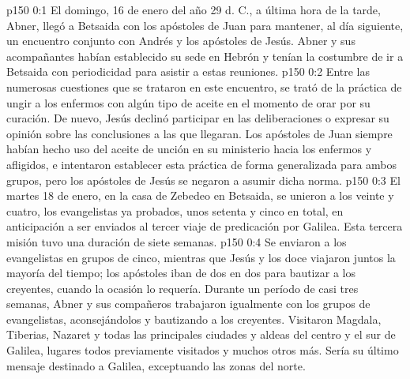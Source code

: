 \author{Comisión de seres intermedios}
\vs p150 0:1 El domingo, 16 de enero del año 29 d. C., a última hora de la tarde, Abner, llegó a Betsaida con los apóstoles de Juan para mantener, al día siguiente, un encuentro conjunto con Andrés y los apóstoles de Jesús. Abner y sus acompañantes habían establecido su sede en Hebrón y tenían la costumbre de ir a Betsaida con periodicidad para asistir a estas reuniones.
\vs p150 0:2 Entre las numerosas cuestiones que se trataron en este encuentro, se trató de la práctica de ungir a los enfermos con algún tipo de aceite en el momento de orar por su curación. De nuevo, Jesús declinó participar en las deliberaciones o expresar su opinión sobre las conclusiones a las que llegaran. Los apóstoles de Juan siempre habían hecho uso del aceite de unción en su ministerio hacia los enfermos y afligidos, e intentaron establecer esta práctica de forma generalizada para ambos grupos, pero los apóstoles de Jesús se negaron a asumir dicha norma.
\vs p150 0:3 \pc El martes 18 de enero, en la casa de Zebedeo en Betsaida, se unieron a los veinte y cuatro, los evangelistas ya probados, unos setenta y cinco en total, en anticipación a ser enviados al tercer viaje de predicación por Galilea. Esta tercera misión tuvo una duración de siete semanas.
\vs p150 0:4 Se enviaron a los evangelistas en grupos de cinco, mientras que Jesús y los doce viajaron juntos la mayoría del tiempo; los apóstoles iban de dos en dos para bautizar a los creyentes, cuando la ocasión lo requería. Durante un período de casi tres semanas, Abner y sus compañeros trabajaron igualmente con los grupos de evangelistas, aconsejándolos y bautizando a los creyentes. Visitaron Magdala, Tiberias, Nazaret y todas las principales ciudades y aldeas del centro y el sur de Galilea, lugares todos previamente visitados y muchos otros más. Sería su último mensaje destinado a Galilea, exceptuando las zonas del norte.
